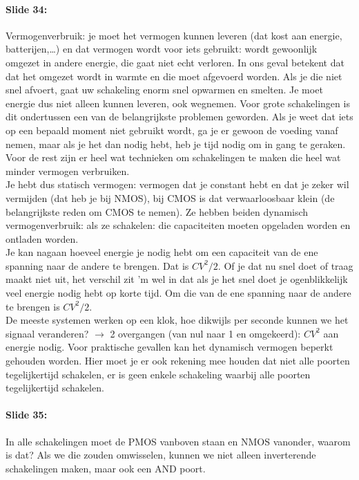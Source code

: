 \documentclass[10pt,a4paper]{book}
\begin{document}
\paragraph{Slide 34:} Vermogenverbruik: je moet het vermogen kunnen leveren (dat kost aan energie, batterijen,\ldots) en dat vermogen wordt voor iets gebruikt: wordt gewoonlijk omgezet in andere energie, die gaat niet echt verloren. In ons geval betekent dat dat het omgezet wordt in warmte en die moet afgevoerd worden. Als je die niet snel afvoert, gaat uw schakeling enorm snel opwarmen en smelten. Je moet energie dus niet alleen kunnen leveren, ook wegnemen. Voor grote schakelingen is dit ondertussen een van de belangrijkste problemen geworden. Als je weet dat iets op een bepaald moment niet gebruikt wordt, ga je er gewoon de voeding vanaf nemen, maar als je het dan nodig hebt, heb je tijd nodig om in gang te geraken. Voor de rest zijn er heel wat technieken om schakelingen te maken die heel wat minder vermogen verbruiken.\\
Je hebt dus statisch vermogen: vermogen dat je constant hebt en dat je zeker wil vermijden (dat heb je bij NMOS), bij CMOS is dat verwaarloosbaar klein (de belangrijkste reden om CMOS te nemen). Ze hebben beiden dynamisch vermogenverbruik: als ze schakelen: die capaciteiten moeten opgeladen worden en ontladen worden. \\
Je kan nagaan hoeveel energie je nodig hebt om een capaciteit van de ene spanning naar de andere te brengen. Dat is $CV^2/2$. Of je dat nu snel doet of traag maakt niet uit, het verschil zit 'm wel in dat als je het snel doet je ogenblikkelijk veel energie nodig hebt op korte tijd. Om die van de ene spanning naar de andere te brengen is $CV^2/2$.\\
De meeste systemen werken op een klok, hoe dikwijls per seconde kunnen we het signaal veranderen? $\rightarrow$ 2 overgangen (van nul naar 1 en omgekeerd): $CV^2$ aan energie nodig. Voor praktische gevallen kan het dynamisch vermogen beperkt gehouden worden. Hier moet je er ook rekening mee houden dat niet alle poorten tegelijkertijd schakelen, er is geen enkele schakeling waarbij alle poorten tegelijkertijd schakelen. 

\paragraph{Slide 35:} In alle schakelingen moet de PMOS vanboven staan en NMOS vanonder, waarom is dat? Als we die zouden omwisselen, kunnen we niet alleen inverterende schakelingen maken, maar ook een AND poort. 
\end{document}
